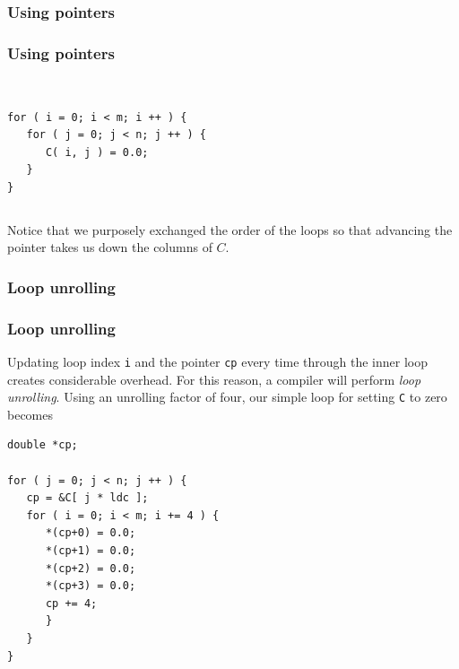 \documentclass[xcolor=pdflatex,dvipsnames,table]{beamer}
\begin{document}
\subsubsection{Using pointers}
\begin{frame}[fragile]
\frametitle{Using pointers}

\begin{columns}
\begin{Verbatim}[frame=single]

for ( i = 0; i < m; i ++ ) {
   for ( j = 0; j < n; j ++ ) {
      C( i, j ) = 0.0;
   }
}

\end{Verbatim}
\end{columns}

Notice that we purposely exchanged the order of the loops so that advancing the pointer takes us down the columns of $ C $.

\end{frame}

\subsubsection{Loop unrolling}
\begin{frame}[fragile]
\frametitle{Loop unrolling}

Updating loop index {\tt i} and the pointer {\tt cp} every time through the inner loop creates considerable overhead.  For this reason, a compiler will perform {\em loop unrolling}.  Using an unrolling factor of four, our simple loop for setting {\tt C} to zero becomes
\begin{Verbatim}[frame=single]
double *cp;

for ( j = 0; j < n; j ++ ) {
   cp = &C[ j * ldc ];
   for ( i = 0; i < m; i += 4 ) {
      *(cp+0) = 0.0;
      *(cp+1) = 0.0;
      *(cp+2) = 0.0;
      *(cp+3) = 0.0;
      cp += 4;
      }
   }
}
\end{Verbatim}
\end{frame}
\end{document}
